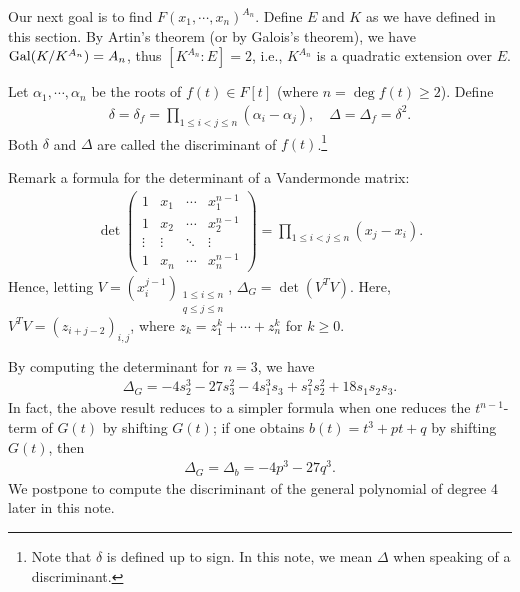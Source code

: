Our next goal is to find $F(x_1, \cdots, x_n)^{A_n}$.
Define $E$ and $K$ as we have defined in this section.
By Artin's theorem (or by Galois's theorem), we have ${\textrm{Gal}({K/K^{A_n}})}=A_n$, thus $[K^{A_n}: E]=2$, i.e., $K^{A_n}$ is a quadratic extension over $E$.

\begin{defi}[Discriminant]
    Let $\alpha_1, \cdots, \alpha_n$ be the roots of $f(t)\in F[t]$ (where $n=\deg f(t)\geq 2$).
    Define
    \begin{align*}
        \delta=\delta_f=\prod_{1\leq i<j\leq n}(\alpha_i-\alpha_j),\quad\Delta=\Delta_f=\delta^2.
    \end{align*}
    Both $\delta$ and $\Delta$ are called the discriminant of $f(t)$.\footnote{Note that $\delta$ is defined up to sign. In this note, we mean $\Delta$ when speaking of a discriminant.}
\end{defi}
\begin{obs}
    Remark a formula for the determinant of a Vandermonde matrix:
    \begin{align*}
        \det\begin{pmatrix}
                1   &   x_1 &   \cdots  &   x_1^{n-1}\\
                1   &   x_2 &   \cdots  &   x_2^{n-1}\\
            \vdots  &\vdots &   \ddots  &   \vdots   \\
                1   &   x_n &   \cdots  &   x_n^{n-1}
        \end{pmatrix}
        =\prod_{1\leq i<j\leq n}(x_j-x_i).
    \end{align*}
    Hence, letting $V=(x_i^{j-1})_{\substack{1\leq i\leq n\\q\leq j\leq n}}$, $\Delta_G=\det(V^T V)$.
    Here, $V^T V=(z_{i+j-2})_{i, j}$, where $z_k=z_1^k+\cdots+z_n^k$ for $k\geq 0$.

    By computing the determinant for $n=3$, we have
    \begin{align*}
        \Delta_G=-4s_2^3-27s_3^2-4s_1^3s_3+s_1^2s_2^2+18s_1s_2s_3.
    \end{align*}
    In fact, the above result reduces to a simpler formula when one reduces the $t^{n-1}$-term of $G(t)$ by shifting $G(t)$; if one obtains $b(t)=t^3+pt+q$ by shifting $G(t)$, then
    \begin{align*}
        \Delta_G=\Delta_b=-4p^3-27q^3.
    \end{align*}
    We postpone to compute the discriminant of the general polynomial of degree 4 later in this note.
\end{obs}

